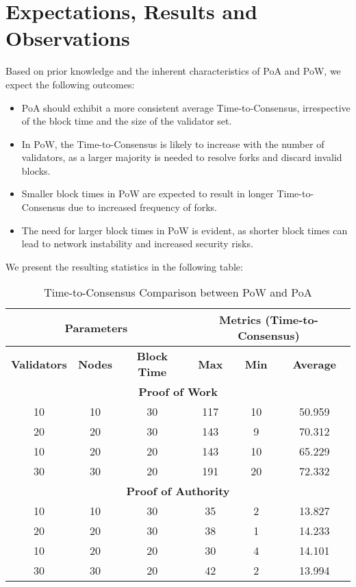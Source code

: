 \section*{Expectations, Results and Observations}

Based on prior knowledge and the inherent characteristics of PoA and PoW, we expect the following outcomes:

\begin{itemize}
    \item PoA should exhibit a more consistent average Time-to-Consensus, irrespective of the block time and the size of the validator set.
    \item In PoW, the Time-to-Consensus is likely to increase with the number of validators, as a larger majority is needed to resolve forks and discard invalid blocks.
    \item Smaller block times in PoW are expected to result in longer Time-to-Consensus due to increased frequency of forks.
    \item The need for larger block times in PoW is evident, as shorter block times can lead to network instability and increased security risks.
\end{itemize}


We present the resulting statistics in the following table:


\begin{table}[h]
\centering
\caption{Time-to-Consensus Comparison between PoW and PoA}
\label{table:time-to-consensus}
\begin{tabular}{|c|c|c||c|c|c|}
\hline
\multicolumn{3}{|c||}{\textbf{Parameters}} & \multicolumn{3}{c|}{\textbf{Metrics (Time-to-Consensus)}} \\
\hline
\textbf{Validators} & \textbf{Nodes} & \textbf{Block Time} & \textbf{Max} & \textbf{Min} & \textbf{Average} \\
\hline
\multicolumn{6}{|c|}{\textbf{Proof of Work}} \\
\hline
\rowcolor{Gray}
10 & 10 & 30 & 117 & 10 & 50.959 \\
\rowcolor{LightBlue}
20 & 20 & 30 & 143 & 9 & 70.312 \\
\rowcolor{LightYellow}
10 & 20 & 20 & 143 & 10 & 65.229 \\
\rowcolor{LightRed}
30 & 30 & 20 & 191 & 20 & 72.332 \\
\hline
\multicolumn{6}{|c|}{\textbf{Proof of Authority}} \\
\hline
\rowcolor{Gray}
10 & 10 & 30 & 35 & 2 & 13.827 \\
\rowcolor{LightBlue}
20 & 20 & 30 & 38 & 1 & 14.233 \\
\rowcolor{LightYellow}
10 & 20 & 20 & 30 & 4 & 14.101 \\
\rowcolor{LightRed}
30 & 30 & 20 & 42 & 2 & 13.994 \\
\hline
\end{tabular}
\end{table}



